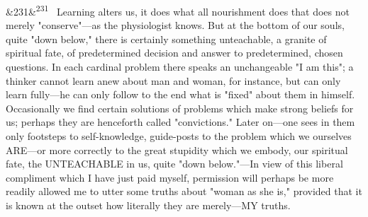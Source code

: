 \documentclass[12pt]{article}
\newcommand{\para}[1][]{\par\noindent\ifx&#1&\else\textsuperscript{\footnotesize #1}~\fi}
\begin{document}
\para[231] Learning alters us, it does what all nourishment does that does not merely "conserve"---as the physiologist knows. But at the bottom of our souls, quite "down below," there is certainly something unteachable, a granite of spiritual fate, of predetermined decision and answer to predetermined, chosen questions. In each cardinal problem there speaks an unchangeable "I am this"; a thinker cannot learn anew about man and woman, for instance, but can only learn fully---he can only follow to the end what is "fixed" about them in himself. Occasionally we find certain solutions of problems which make strong beliefs for us; perhaps they are henceforth called "convictions." Later on---one sees in them only footsteps to self-knowledge, guide-posts to the problem which we ourselves ARE---or more correctly to the great stupidity which we embody, our spiritual fate, the UNTEACHABLE in us, quite "down below."---In view of this liberal compliment which I have just paid myself, permission will perhaps be more readily allowed me to utter some truths about "woman as she is," provided that it is known at the outset how literally they are merely---MY truths.
\end{document}
